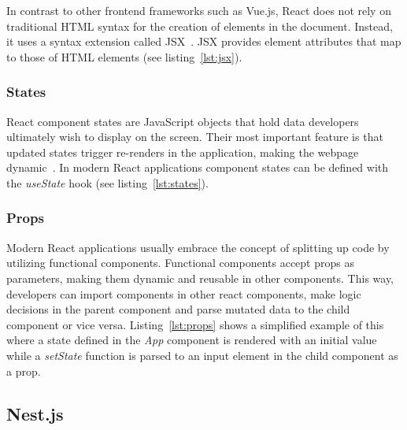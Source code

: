 In contrast to other frontend frameworks such as Vue.js, React does not rely on traditional \gls{HTML} syntax for the creation of elements in the document.
Instead, it uses a syntax extension called \gls{JSX}~\autocite{meta_platforms_inc_react_2022}.
\gls{JSX} provides element attributes that map to those of \gls{HTML} elements (see listing~\ref{lst:jsx}).


\subsubsection{States}\label{subsubsec:states}

React component states are JavaScript objects that hold data developers ultimately wish to display on the screen.
Their most important feature is that updated states trigger re-renders in the application, making the webpage dynamic~\autocite{meta_platforms_inc_react_2022}.
In modern React applications component states can be defined with the \emph{useState} hook (see listing~\ref{lst:states}).


\subsubsection{Props}\label{subsubsec:props}

Modern React applications usually embrace the concept of splitting up code by utilizing functional components.
Functional components accept \glspl{prop} as parameters, making them dynamic and reusable in other components.
This way, developers can import components in other react components, make logic decisions in the parent component and parse mutated data to the child component or vice versa.
Listing~\ref{lst:props} shows a simplified example of this where a state defined in the \emph{App} component is rendered with an initial value while a \emph{setState} function is parsed to an input element in the child component as a \gls{prop}.


\subsection{Nest.js}\label{subsec:nest.js}

